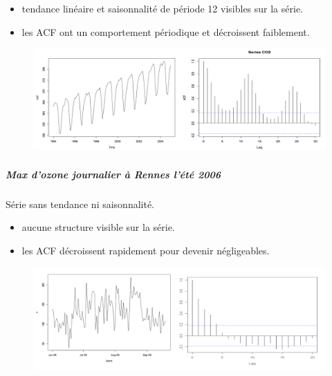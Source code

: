 \begin{itemize}
\item tendance linéaire et saisonnalité de période 12 visibles sur la série.
\item les ACF ont un comportement périodique et décroissent faiblement.
\end{itemize}
\begin{figure}[H]\begin{center}\includegraphics[scale=0.7]{ilu/ccm30.png}\end{center}\end{figure}
\subparagraph{Max d'ozone journalier à Rennes l'été 2006}
Série sans tendance ni saisonnalité.
\begin{itemize}
\item aucune structure visible sur la série.
\item les ACF décroissent rapidement pour devenir négligeables.
\end{itemize}
\begin{figure}[H]\begin{center}\includegraphics[scale=0.7]{ilu/ccm31.png}\end{center}\end{figure}

